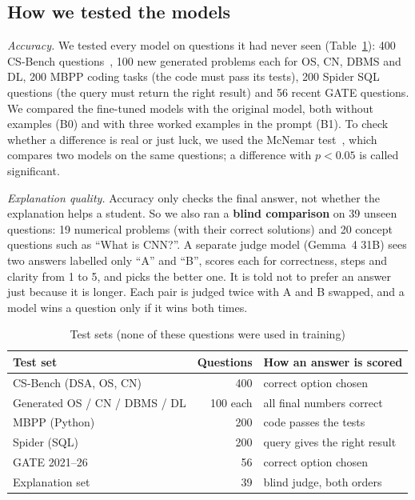 \documentclass[conference]{IEEEtran}
\begin{document}
\subsection{How we tested the models}
\emph{Accuracy.} We tested every model on questions it had never seen (Table~\ref{tab:tests}): 400 CS-Bench questions~\cite{csbench}, 100 new generated problems each for OS, CN, DBMS and DL, 200 MBPP coding tasks (the code must pass its tests), 200 Spider SQL questions (the query must return the right result) and 56 recent GATE questions. We compared the fine-tuned models with the original model, both without examples (B0) and with three worked examples in the prompt (B1). To check whether a difference is real or just luck, we used the McNemar test~\cite{mcnemar}, which compares two models on the same questions; a difference with $p<0.05$ is called significant.

\emph{Explanation quality.} Accuracy only checks the final answer, not whether the explanation helps a student. So we also ran a \textbf{blind comparison} on 39 unseen questions: 19 numerical problems (with their correct solutions) and 20 concept questions such as ``What is CNN?''. A separate judge model (Gemma~4 31B) sees two answers labelled only ``A'' and ``B'', scores each for correctness, steps and clarity from 1 to 5, and picks the better one. It is told not to prefer an answer just because it is longer. Each pair is judged twice with A and B swapped, and a model wins a question only if it wins both times.

\begin{table}[t]
\centering
\caption{Test sets (none of these questions were used in training)}
\label{tab:tests}
\begin{tabular}{@{}l r l@{}}
\toprule
Test set & Questions & How an answer is scored \\
\midrule
CS-Bench (DSA, OS, CN) & 400 & correct option chosen \\
Generated OS / CN / DBMS / DL & 100 each & all final numbers correct \\
MBPP (Python) & 200 & code passes the tests \\
Spider (SQL) & 200 & query gives the right result \\
GATE 2021--26 & 56 & correct option chosen \\
Explanation set & 39 & blind judge, both orders \\
\bottomrule
\end{tabular}
\end{table}
\end{document}
